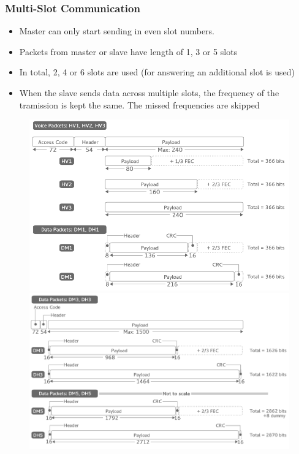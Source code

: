 \subsubsection{Multi-Slot Communication}
\begin{itemize}[noitemsep]
\item Master can only start sending in even slot numbers.
\item Packets from master or slave have length of 1, 3 or 5 slots
\item In total, 2, 4 or 6 slots are used (for answering an additional slot is used)
\item When the slave sends data across multiple slots, the frequency of the tramission is kept the same. The missed frequencies are skipped
\end{itemize}

\begin{figure}[ht]
	\centering
  	\includegraphics[scale=0.4]{img/8_packet_1.png}
	\includegraphics[scale=0.3]{img/8_packet_2.png}
	\label{fig_bluetooth_packet_overview}
\end{figure}



